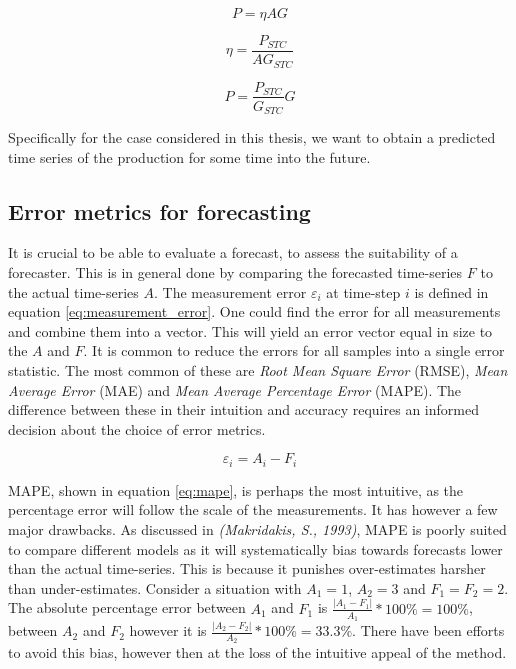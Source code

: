 \begin{equation}
    P = \eta A G
    \label{eq:pv_power_simple}
\end{equation}

\begin{equation}
    \eta =  \frac{P_{STC}}{A G_{STC}}
    \label{eq:pv_efficency}
\end{equation}

\begin{equation}
    P = \frac{P_{STC}}{G_{STC}} G
    \label{eq:pv_power_full}
\end{equation}


Specifically for the case considered in this thesis, we want to obtain a predicted time series of the production for some time into the future. 

\subsection{Error metrics for forecasting}
It is crucial to be able to evaluate a forecast, to assess the suitability of a forecaster. This is in general done by comparing the forecasted time-series $F$ to the actual time-series $A$. The measurement error $\varepsilon_i$ at time-step $i$ is defined in equation \ref{eq:measurement_error}. One could find the error for all measurements and combine them into a vector. This will yield an error vector equal in size to the $A$ and $F$. It is common to reduce the errors for all samples into a single error statistic. The most common of these are \textit{Root Mean Square Error} (RMSE), \textit{Mean Average Error} (MAE) and \textit{Mean Average Percentage Error} (MAPE). The difference between these in their intuition and accuracy requires an informed decision about the choice of error metrics.

\begin{equation}
    \varepsilon_i = A_i - F_i
    \label{eq:measurement_error}
\end{equation}

MAPE, shown in equation \ref{eq:mape}, is perhaps the most intuitive, as the percentage error will follow the scale of the measurements. It has however a few major drawbacks.\cite{MAKRIDAKIS1993527} As discussed in \textit{(Makridakis, S., 1993)}, MAPE is poorly suited to compare different models as it will systematically bias towards forecasts lower than the actual time-series. This is because it punishes over-estimates harsher than under-estimates. Consider a situation with $A_1 = 1$, $A_2 = 3$ and $F_1 = F_2 = 2$. The absolute percentage error between $A_1$ and $F_1$ is $\frac{|A_1-F_1|}{A_1}*100\%=100\%$, between $A_2$ and $F_2$ however it is $\frac{|A_2-F_2|}{A_2}*100\%=33.3\%$\cite{kolassa2011}. There have been efforts to avoid this bias, however then at the loss of the intuitive appeal of the method.\\

